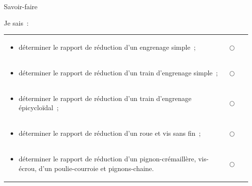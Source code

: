 Savoir-faire

Je sais~:

\begin{center}\begin{tabular}[]{@{}
  >{\raggedright\arraybackslash}p{0.9045\linewidth}
  >{\raggedright\arraybackslash}p{0.0955\linewidth}@{}}

\begin{minipage}[b]{\linewidth}\raggedright
\begin{itemize}
\item
  déterminer le rapport de réduction d'un engrenage simple~;
\end{itemize}
\end{minipage} & \begin{minipage}[b]{\linewidth}\raggedright
$\bigcirc$
\end{minipage} \\




\begin{minipage}[t]{\linewidth}\raggedright
\begin{itemize}
\item
  déterminer le rapport de réduction d'un train d'engrenage simple~;
\end{itemize}
\end{minipage} & $\bigcirc$ \\
\begin{minipage}[t]{\linewidth}\raggedright
\begin{itemize}
\item
  déterminer le rapport de réduction d'un train d'engrenage
  épicycloïdal~;
\end{itemize}
\end{minipage} & $\bigcirc$ \\
\begin{minipage}[t]{\linewidth}\raggedright
\begin{itemize}
\item
  déterminer le rapport de réduction d'un roue et vis sans fin~;
\end{itemize}
\end{minipage} & $\bigcirc$ \\
\begin{minipage}[t]{\linewidth}\raggedright
\begin{itemize}
\item
  déterminer le rapport de réduction d'un pignon-crémaillère, vis-écrou,
  d'un poulie-courroie et pignons-chaine.
\end{itemize}
\end{minipage} & $\bigcirc$ \\
\end{tabular}\end{center}

